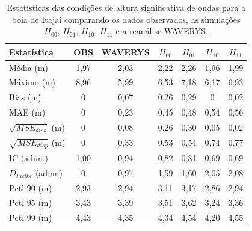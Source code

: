 \begin{table}[ht]
\centering
\begin{tabular}{lcccccc}
\hline
\textbf{Estatística} & \textbf{OBS} & \textbf{WAVERYS} & \textbf{$H_{00}$} & \textbf{$H_{01}$} & \textbf{$H_{10}$} & \textbf{$H_{11}$} \\
\hline
Média (m) & 1,97 & 2,03 & 2,22 & 2,26 & 1,96 & 1,99 \\
Máximo (m) & 8,96 & 5,99 & 6,53 & 7,18 & 6,17 & 6,93 \\
Bias (m) & 0 & 0,07 & 0,26 & 0,29 & 0 & 0,02 \\
MAE (m) & 0 & 0,23 & 0,45 & 0,48 & 0,54 & 0,56 \\
$\sqrt{MSE_{diss}}$ (m) & 0 & 0,08 & 0,26 & 0,30 & 0,05 & 0,02 \\
$\sqrt{MSE_{disp}}$ (m) & 0 & 0,33 & 0,53 & 0,54 & 0,74 & 0,77 \\
IC (adim.) & 1,00 & 0,94 & 0,82 & 0,81 & 0,69 & 0,69 \\
$D_{Pielke}$ (adim.) & 0 & 0,97 & 1,59 & 1,60 & 2,05 & 2,08 \\
Pctl 90 (m) & 2,93 & 2,94 & 3,11 & 3,17 & 2,86 & 2,94 \\
Pctl 95 (m) & 3,43 & 3,39 & 3,51 & 3,62 & 3,24 & 3,36 \\
Pctl 99 (m) & 4,43 & 4,35 & 4,34 & 4,54 & 4,20 & 4,55 \\
\hline
\end{tabular}
\caption{Estatísticas das condições de altura significativa de ondas para a boia de Itajaí comparando os dados observados, as simulações $H_{00}$, $H_{01}$, $H_{10}$, $H_{11}$ e a reanálise WAVERYS.}
\label{estats:itajai}
\end{table}